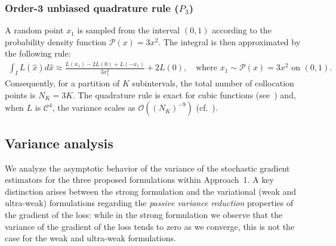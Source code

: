 \documentclass{article}
\theoremstyle{definition}
\begin{document}
\subsubsection*{Order-3 unbiased quadrature rule ($P_3$)}
A random point $x_1$ is sampled from the interval $(0,1)$ according to the probability density function $\mathcal{P}(x) = 3x^2$. The integral is then approximated by the following rule:
\begin{align*}
    \int_I L(\hat{x}) d\hat{x} \approx \frac{L(x_1) - 2L(0) + L(-x_1)}{3x_1^2} + 2L(0), \quad \text{where } x_1 \sim \mathcal{P}(x)=3x^2 \text{ on } (0,1).
\end{align*}
Consequently, for a partition of $K$ subintervals, the total number of collocation points is $N_K = 3K$. The quadrature rule is exact for cubic functions (see~\cite{Siegel1985UnbiasedMontecarlo}) and, when $L$ is $\mathcal{C}^4$, the variance scales as $\mathcal{O}((N_K)^{-9})$ (cf.~\cite{taylor2025stochastic}).

\subsection{Variance analysis}
We analyze the asymptotic behavior of the variance of the stochastic gradient estimators for the three proposed formulations within Approach~1. A key distinction arises between the strong formulation and the variational (weak and ultra-weak) formulations regarding the {\em passive variance reduction} properties of the gradient of the loss: while in the strong formulation we observe that the variance of the gradient of the loss tends to zero as we converge, this is not the case for the weak and ultra-weak formulations.
\end{document}
